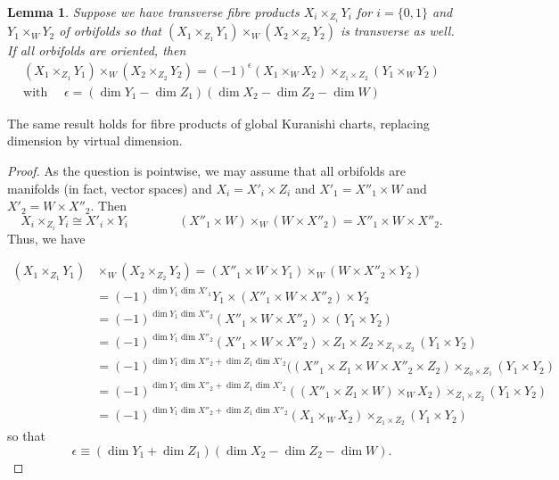 \documentclass[11pt,psamsfonts, oneside, reqno]{amsart}
\newtheorem{lemma}[theorem]{Lemma}
\theoremstyle{definition}
\theoremstyle{remark}
\numberwithin{equation}{section}
\begin{document}
\begin{lemma}\label{lem:permuting-fibre-products} Suppose we have transverse fibre products $X_i\times_{Z_i}Y_i$ for $i = \{0,1\}$ and $Y_1 \times_WY_2$ of orbifolds so that $(X_1\times_{Z_1}Y_1)\times_W(X_2\times_{Z_2}Y_2)$ is transverse as well. If all orbifolds are oriented, then 
	\begin{gather*}\label{} (X_1\times_{Z_1}Y_1)\times_W(X_2\times_{Z_2}Y_2) = (-1)^{\epsilon}(X_1\times_W X_2)\times_{Z_1\times Z_2} (Y_1\times_W Y_2)\\
		\text{with }\quad \epsilon =(\dim Y_1 -\dim Z_1)(\dim X_2-\dim Z_2 -\dim W)\end{gather*}
\end{lemma}

\noindent
The same result holds for fibre products of global Kuranishi charts, replacing dimension by virtual dimension.

\begin{proof} As the question is pointwise, we may assume that all orbifolds are manifolds (in fact, vector spaces) and $X_i = X'_i \times Z_i$ and $X'_1 = X''_1\times W$ and $X'_2 = W\times X''_2$. Then 
	$$X_i \times_{Z_i} Y_i \cong X'_i \times Y_i\qquad\qquad (X''_1\times W)\times_W (W\times X''_2) = X''_1\times W\times X''_2.$$\noindent
	Thus, we have 
	
	\begin{align*}(X_1\times_{Z_1}Y_1)&\times_W(X_2\times_{Z_2}Y_2) =  (X''_1\times W\times Y_1)\times_W(W\times X''_2\times Y_2)
		\\&= (-1)^{\dim Y_1 \dim X'_1} Y_1 \times (X''_1\times W\times X''_2)\times Y_2 
		\\&=(-1)^{\dim Y_1\dim X''_2} (X''_1\times W\times X''_2)\times(Y_1\times Y_2)
		\\&=(-1)^{\dim Y_1\dim X''_2} (X''_1\times W\times X''_2)\times Z_1\times Z_2\times_{Z_1\times Z_2}(Y_1\times Y_2)
		\\&=(-1)^{\dim Y_1\dim X''_2+\dim Z_1\dim X'_2} ((X''_1\times Z_1\times W\times X''_2\times Z_2)\times_{Z_0\times Z_1}(Y_1\times Y_2)
		\\&  =(-1)^{\dim Y_1\dim X''_2+\dim Z_1\dim X'_2} ((X''_1\times Z_1\times W) \times_W X_2)\times_{Z_1\times Z_2} (Y_1\times Y_2)
		\\&=(-1)^{\dim Y_1\dim X''_2+\dim Z_1\dim X''_2}(X_1\times_W X_2)\times_{Z_1\times Z_2} (Y_1\times Y_2)
	\end{align*}
	so that 
	\begin{equation*}\epsilon \equiv(\dim Y_1 +\dim Z_1)(\dim X_2-\dim Z_2 -\dim W).\end{equation*}
\end{proof}
\end{document}
